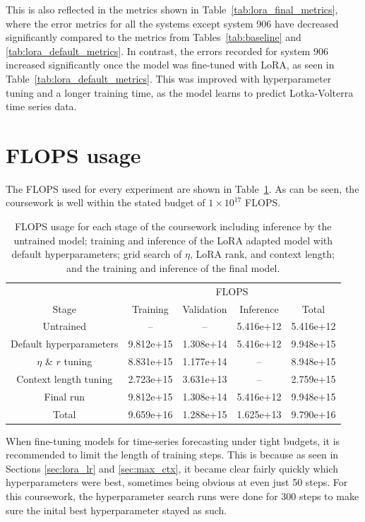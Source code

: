 \documentclass[11pt,a4paper]{article}
\begin{document}
This is also reflected in the metrics shown in Table~\ref{tab:lora_final_metrics}, where the error metrics for all the systems except system 906 have decreased significantly compared to the metrics from Tables~\ref{tab:baseline} and \ref{tab:lora_default_metrics}. In contrast, the errors recorded for system 906 increased significantly once the model was fine-tuned with LoRA, as seen in Table~\ref{tab:lora_default_metrics}. This was improved with hyperparameter tuning and a longer training time, as the model learns to predict Lotka-Volterra time series data. 

\section{FLOPS usage}

The FLOPS used for every experiment are shown in Table~\ref{tab:flops_track}. As can be seen, the coursework is well within the stated budget of $1 \times 10^{17}$ FLOPS.

\begin{table}[h]
    \centering
    \begin{tabular}{c|c|c|c|c}
        & \multicolumn{4}{|c}{FLOPS}\\
        Stage & Training & Validation & Inference & Total \\
        \hline
        Untrained & -- & -- & 5.416e+12 & 5.416e+12 \\
        Default hyperparameters & 9.812e+15 & 1.308e+14 & 5.416e+12 & 9.948e+15 \\
        $\eta$ \& $r$ tuning & 8.831e+15 & 1.177e+14 & -- & 8.948e+15 \\
        Context length tuning & 2.723e+15 & 3.631e+13 & -- & 2.759e+15 \\
        Final run & 9.812e+15 & 1.308e+14 & 5.416e+12 & 9.948e+15 \\
        \hline
        Total & 9.659e+16 & 1.288e+15 & 1.625e+13 & 9.790e+16 \\
    \end{tabular}
    \caption{FLOPS usage for each stage of the coursework including inference by the untrained model; training and inference of the LoRA adapted model with default hyperparameters; grid search of $\eta$, LoRA rank, and context length; and the training and inference of the final model.}
    \label{tab:flops_track}
\end{table}

When fine-tuning models for time-series forecasting under tight budgets, it is recommended to limit the length of training steps. This is because as seen in Sections \ref{sec:lora_lr} and \ref{sec:max_ctx}, it became clear fairly quickly which hyperparameters were best, sometimes being obvious at even just 50 steps. For this coursework, the hyperparameter search runs were done for 300 steps to make sure the inital best hyperparameter stayed as such.
\end{document}
